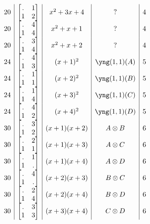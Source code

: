\documentclass[11pt,oneside]{article}
\newcommand{\tensor}{\otimes}
\begin{document}
$$\begin{array}{c|c|c|c|r}
20  &  \begin{bmatrix}.&1\\1&2\end{bmatrix}   & x^2+3x+4  & ? & 4  \\
20  &  \begin{bmatrix}.&4\\1&4\end{bmatrix}   & x^2+x+1   & ? & 4  \\
20  &  \begin{bmatrix}.&3\\1&4\end{bmatrix}   & x^2+x+2   & ? & 4  \\
24  &  \begin{bmatrix}.&4\\1&3\end{bmatrix}   & (x+1)^2   & \yng(1,1)(A) & 5  \\
24  &  \begin{bmatrix}.&1\\1&1\end{bmatrix}   & (x+2)^2   & \yng(1,1)(B) & 5  \\
24  &  \begin{bmatrix}.&1\\1&4\end{bmatrix}   & (x+3)^2   & \yng(1,1)(C) & 5  \\
24  &  \begin{bmatrix}.&4\\1&2\end{bmatrix}   & (x+4)^2   & \yng(1,1)(D) & 5  \\
30  &  \begin{bmatrix}.&3\\1&2\end{bmatrix}   & (x+1)(x+2)  & A\tensor B & 6  \\
30  &  \begin{bmatrix}.&2\\1&1\end{bmatrix}   & (x+1)(x+3)  & A\tensor C & 6  \\
30  &  \begin{bmatrix}.&1\\1&.\end{bmatrix}   & (x+1)(x+4)  & A\tensor D & 6  \\
30  &  \begin{bmatrix}.&4\\1&.\end{bmatrix}   & (x+2)(x+3)  & B\tensor C & 6  \\
30  &  \begin{bmatrix}.&2\\1&4\end{bmatrix}   & (x+2)(x+4)  & B\tensor D & 6  \\
30  &  \begin{bmatrix}.&3\\1&3\end{bmatrix}   & (x+3)(x+4)  & C\tensor D & 6  \\
\end{array}
$$
\end{document}

